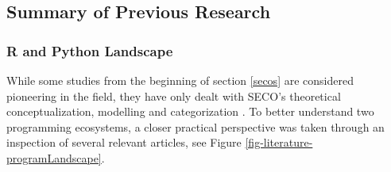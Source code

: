 \subsection{Summary of Previous Research}
\label{relResearch}
\subsubsection{R and Python Landscape}
\label{rpythonlandscape}
While some studies from the beginning of section \ref{secos} are considered pioneering in the field, they have only dealt with \ac{SECO}'s theoretical conceptualization, modelling and categorization \parencite{Christensen2014AnalysisEcosystem}.
To better understand two programming ecosystems, a closer practical perspective was taken through an inspection of several relevant articles, see Figure \ref{fig-literature-programLandscape}.

